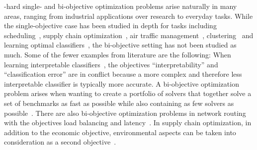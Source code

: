 \NP-hard single- and bi-objective optimization problems arise naturally in many areas, ranging from industrial applications over research to everyday tasks.
While the single-objective case has been studied in depth for tasks including scheduling~\autocites{DBLP:conf/cp/Stojadinovic14,DBLP:conf/cpaior/BofillGSV15,DBLP:journals/ior/Solomon87,DBLP:journals/candie/AkyolB07}, supply chain optimization~\autocite{DBLP:journals/cce/Papageorgiou09}, air traffic management~\autocites{DBLP:journals/ior/BertsimasLO11,RichardsHow2002Aircrafttrajectoryplanning}, clustering~\autocite{DBLP:journals/ai/DaoDV17,DBLP:conf/sdm/DavidsonRS10} and learning optimal classifiers~\autocites{DBLP:conf/cp/MaliotovM18,DBLP:conf/ijcai/NarodytskaIPM18,DBLP:conf/ijcai/Hu0HH20,DBLP:conf/cp/YuISB20,DBLP:conf/aaai/DemirovicS21,DBLP:conf/cp/ShatiCM21,DBLP:conf/cade/IgnatievPNM18}, the bi-objective setting has not been studied as much.
Some of the fewer examples from literature are the following:
When learning interpretable classifiers~\autocites{DBLP:conf/ijcai/Ignatiev0NS21,DBLP:conf/cp/MaliotovM18,DBLP:conf/ijcai/NarodytskaIPM18,DBLP:conf/ijcai/Hu0HH20,DBLP:conf/cp/YuISB20,DBLP:conf/aaai/Ignatiev0S021,DBLP:conf/cade/IgnatievPNM18}, the objectives ``interpretability'' and ``classification error'' are in conflict because a more complex and therefore less interpretable classifier is typically more accurate.
A bi-objective optimization problem arises when wanting to create a portfolio of solvers that together solve a set of benchmarks as fast as possible while also containing as few solvers as possible~\autocite{DBLP:conf/cp/JanotaMSM21}.
There are also bi-objective optimization problems in network routing with the objectives load balancing and latency~\autocite{SilverioEtAl2022biobjectiveoptimization}.
In supply chain optimization, in addition to the economic objective, environmental aspects can be taken into consideration as a second objective~\autocites{DBLP:journals/cce/Pinto-VarelaBN11,DBLP:journals/candie/TautenhainBN19}.

